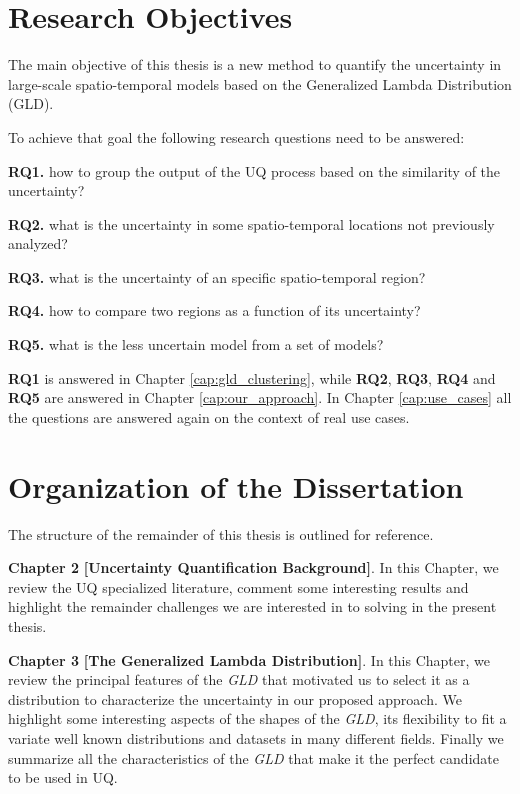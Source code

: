 \section{Research Objectives}

\begin{tcolorbox}
The main objective of this thesis is a new method to quantify the uncertainty in large-scale spatio-temporal models based on the Generalized Lambda Distribution (GLD).
\end{tcolorbox}

To achieve that goal the following research questions need to be answered:

\textbf{RQ1.} how to group the output of the UQ process based on the similarity of the uncertainty?

\textbf{RQ2.} what is the uncertainty in some spatio-temporal locations not previously analyzed?

\textbf{RQ3.} what is the uncertainty of an specific spatio-temporal region?

\textbf{RQ4.} how to compare two regions as a function of its uncertainty?

\textbf{RQ5.} what is the less uncertain model from a set of models?

\textbf{RQ1} is answered in Chapter \ref{cap:gld_clustering}, while \textbf{RQ2}, \textbf{RQ3}, \textbf{RQ4} and \textbf{RQ5} are answered in Chapter \ref{cap:our_approach}. In Chapter \ref{cap:use_cases} all the questions are answered again on the context of real use cases.


\section{Organization of the Dissertation}

The structure of the remainder of this thesis is outlined for reference.

\textbf{Chapter 2} \textbf{[Uncertainty Quantification Background]}. In this Chapter, we review the UQ specialized literature, comment some interesting results and highlight the remainder challenges we are interested in to solving in the present thesis.

\textbf{Chapter 3} \textbf{[The Generalized Lambda Distribution]}. In this Chapter, we review the principal features of the \textit{GLD} that motivated us to select it as a distribution to characterize the uncertainty in our proposed approach. We highlight some interesting aspects of the shapes of the \textit{GLD}, its flexibility to fit a variate well known distributions and datasets in many different fields. Finally we summarize all the characteristics of the \textit{GLD} that make it the perfect candidate to be used in UQ. 


